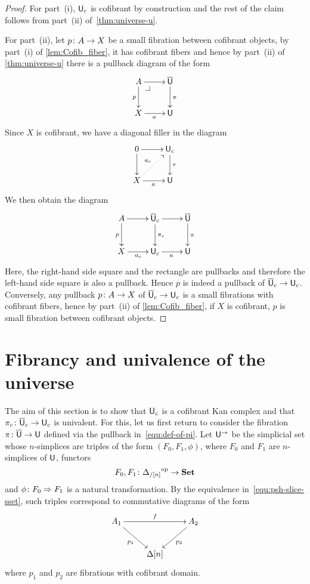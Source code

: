 \documentclass[reqno,10pt,a4paper,oneside,draft]{amsart}
\begin{document}
\begin{proof} For part~(i), $\mathsf{U}_c$ is cofibrant by construction and the rest of the claim follows from part~(ii) of~\cref{thm:universe-u}. 


For part~(ii), let $p \colon A \to X$ be a small fibration between cofibrant objects, by part~(i) of \cref{lem:Cofib_fiber}, it has cofibrant fibers and hence by part~(ii) of \cref{thm:universe-u} there is a pullback diagram of the form 
\[
\xymatrix{
A \ar[r] \ar[d]_p \drpullback & \UU \ar[d]^{\pi} \\
X \ar[r]_a & \U }
\]
Since $X$ is cofibrant, we have a diagonal filler in the diagram
\[
\xymatrix{
0 \ar[r] \ar[d] & \U_c \ar[d]^{\tau} \\
X \ar[r]_a \ar@{.>}[ur]^{a_c} & \U }
\]
 We then obtain the diagram
\[
\xymatrix{
A \ar[r] \ar[d]_p &  \UU_c \ar[r]  \ar[d]^{\pi_c}  & \UU \ar[d]^{\pi} \\
X \ar[r]_{a_c} & \U_c \ar[r]_{a} &  \U }
\]
Here, the right-hand side square and the rectangle are pullbacks and therefore the left-hand
side square is also a pullback. Hence $p$ is indeed a pullback of $\overline{\mathsf{U}}_c \rightarrow \mathsf{U}_c$. Conversely, any pullback  $p \colon A \rightarrow X$ of $\overline{\mathsf{U}}_c \rightarrow \mathsf{U}_c$ is a small fibrations with cofibrant fibers, hence by part~(ii) of \ref{lem:Cofib_fiber}, if $X$ is cofibrant, $p$ is small fibration between cofibrant objects.
\end{proof} 

\section{Fibrancy and univalence of the universe}
\label{sec:fibrancy-and-univalence}


The aim of this section is to show that $\mathsf{U}_c$ is a cofibrant Kan complex and that $\pi_c \colon
\overline{\mathsf{U}}_c \to \mathsf{U}_c$ is univalent.  For this, let us first return to consider the fibration $\pi \colon \overline{\mathsf{U}} \to \mathsf{U}$ defined
via the pullback in~\eqref{equ:def-of-pi}. Let $\mathsf{U}^{\rightarrow}$ be the simplicial set whose $n$-simplices are triples of the form $(F_0, F_1, \phi)$, where $F_0$ and $F_1$ are $n$-simplices of $\mathsf{U}$, \ie functors
 \[
F_0, F_1 \colon {\Delta_{/[n]}}^{\operatorname{op}} \rightarrow \mathbf{Set}
\]
and $\phi \colon F_0 \Rightarrow F_1$ is a natural transformation. By the equivalence in~\eqref{equ:psh-slice-sset},
such triples correspond to commutative diagrams of the form
\begin{equation}
\label{equ:corresp}
\begin{gathered}
\xymatrix{ 
A_1 \ar[rr]^{f} \ar[dr]_{p_1} & & A_2 \ar[dl]^{p_2} \\
& \Delta[n] & }
\end{gathered}
\end{equation}
where $p_1$ and $p_2$ are fibrations with cofibrant domain.
\end{document}
